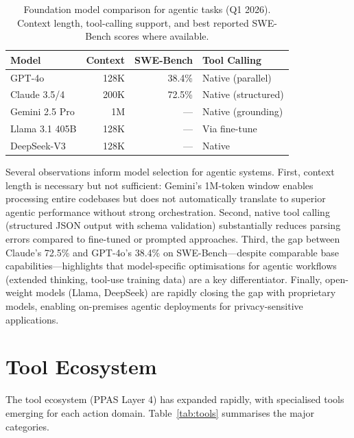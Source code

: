 \documentclass[review]{elsarticle}
\theoremstyle{definition}
\begin{document}
\begin{table}[ht]
\centering
\caption{Foundation model comparison for agentic tasks (Q1 2026). Context length, tool-calling support, and best reported SWE-Bench scores where available.}
\label{tab:models}
\begin{tabular}{lrrl}
\toprule
\textbf{Model} & \textbf{Context} & \textbf{SWE-Bench} & \textbf{Tool Calling} \\
\midrule
GPT-4o \citep{openai2024gpt4o}         & 128K   & 38.4\%  & Native (parallel) \\
Claude 3.5/4 \citep{anthropic2024claude} & 200K   & 72.5\%  & Native (structured) \\
Gemini 2.5 Pro \citep{team2023gemini}   & 1M     & ---     & Native (grounding) \\
Llama 3.1 405B \citep{touvron2023llama} & 128K   & ---     & Via fine-tune \\
DeepSeek-V3 \citep{deepseekai2024deepseek} & 128K & ---     & Native \\
\bottomrule
\end{tabular}
\end{table}

Several observations inform model selection for agentic systems. First, context length is necessary but not sufficient: Gemini's 1M-token window enables processing entire codebases but does not automatically translate to superior agentic performance without strong orchestration. Second, native tool calling (structured JSON output with schema validation) substantially reduces parsing errors compared to fine-tuned or prompted approaches. Third, the gap between Claude's 72.5\% and GPT-4o's 38.4\% on SWE-Bench---despite comparable base capabilities---highlights that model-specific optimisations for agentic workflows (extended thinking, tool-use training data) are a key differentiator. Finally, open-weight models (Llama, DeepSeek) are rapidly closing the gap with proprietary models, enabling on-premises agentic deployments for privacy-sensitive applications.

\section{Tool Ecosystem}\label{sec:tools}

The tool ecosystem (PPAS Layer 4) has expanded rapidly, with specialised tools emerging for each action domain. Table~\ref{tab:tools} summarises the major categories.
\end{document}
